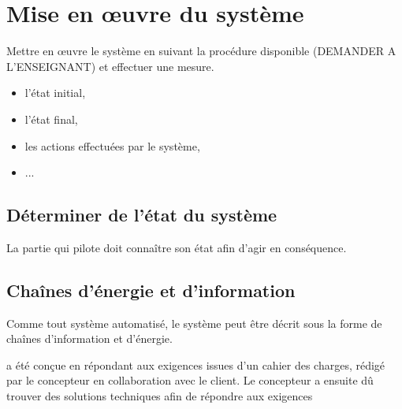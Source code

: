 \section{Mise en \oe uvre du système}


Mettre en \oe uvre le système en suivant la procédure disponible (DEMANDER A L'ENSEIGNANT) et effectuer une mesure.


\begin{itemize}
 \item l'état initial,
 \item l'état final,
 \item les actions effectuées par le système,
 \item ...
\end{itemize}

\subsection{Déterminer de l'état du système}

La partie qui pilote \lesysteme doit connaître son état afin d'agir en conséquence. 



\subsection{Chaînes d'énergie et d'information}

Comme tout système automatisé, le système peut être décrit sous la forme de chaînes d'information et d'énergie.


\lesysteme a été conçue en répondant aux exigences issues d'un cahier des charges, rédigé par le concepteur en collaboration avec le client. Le concepteur a ensuite dû trouver des solutions techniques afin de répondre aux exigences 

